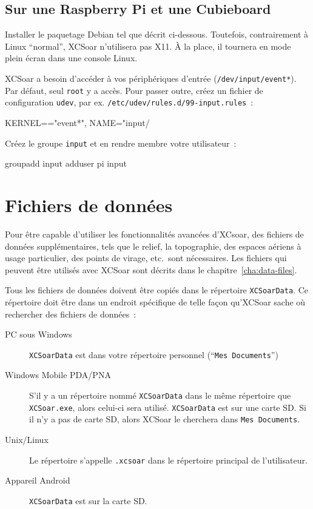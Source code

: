 \subsection*{Sur une Raspberry Pi et une Cubieboard}

Installer le paquetage Debian tel que décrit ci-dessous. Toutefois, contrairement à 
Linux ``normal'', XCSoar n'utilisera pas X11. À la place, il tournera
en mode plein écran dans une console Linux.

XCSoar a besoin d'accéder à vos périphériques d'entrée
(\texttt{/dev/input/event*}). Par défaut, seul \texttt{root} y
a accès. Pour passer outre, créez un fichier de configuration
\texttt{udev}, par ex. \texttt{/etc/udev/rules.d/99-input.rules}~:

\begin{verbatim*}
KERNEL=="event*", NAME="input/%k", MODE="660", GROUP="input"
\end{verbatim*}

Créez le groupe \texttt{input} et en rendre membre votre utilisateur~:

\begin{verbatim*}
groupadd input
adduser pi input
\end{verbatim*}

\section{Fichiers de données}\label{sec:data files}

Pour être capable d'utiliser les fonctionnalités avancées d'XCsoar, des fichiers de données supplémentaires, tels que
le relief, la topographie, des espaces aériens à usage particulier, des points de virage, etc.\, sont nécessaires. Les fichiers
qui peuvent être utilisés avec XCSoar sont décrits dans le chapitre~\ref{cha:data-files}.

Tous les fichiers de données doivent être copiés dans le répertoire 
\texttt{XCSoarData}. Ce répertoire doit être dans un endroit spécifique
de telle façon qu'XCSoar sache où rechercher des fichiers de données~:
\begin{description}
\item[PC sous Windows]
\texttt{XCSoarData} est dans votre répertoire personnel (``\texttt{Mes
Documents}'')
\item[Windows Mobile PDA/PNA]
S'il y a un répertoire nommé \texttt{XCSoarData} dans le même
répertoire que \texttt{XCSoar.exe}, alors celui-ci sera utilisé.
\texttt{XCSoarData} est sur une carte SD. Si il n'y a pas de carte SD, alors
XCSoar le cherchera dans \texttt{Mes Documents}.
\item[Unix/Linux]
Le répertoire s'appelle \verb|.xcsoar| dans le répertoire principal de l'utilisateur.
\item[Appareil Android]
\texttt{XCSoarData} est sur la carte SD.
\end{description}

